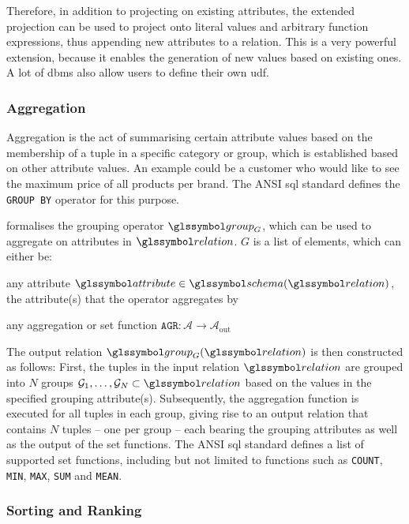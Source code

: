 Therefore, in addition to projecting on existing attributes, the extended projection can be used to project onto literal values and arbitrary function expressions, thus appending new attributes to a relation. This is a very powerful extension, because it enables the generation of new values based on existing ones. A lot of \acrshort{dbms} also allow users to define their own \acrfull{udf}.

\subsubsection{Aggregation}

Aggregation is the act of summarising certain attribute values based on the membership of a tuple in a specific category or group, which is established based on other attribute values. An example could be a customer who would like to see the maximum price of all products per brand. The ANSI \acrshort{sql} standard \cite{XOpen:1996SQL} defines the \texttt{GROUP BY} operator for this purpose.

\cite{Garcia:2009Database} formalises the grouping operator $\group_{G}$, which can be used to aggregate on attributes in $\relation$. $G$ is a list of elements, which can either be:
\begin{enumerate*}[label=(\roman*),itemjoin={{, }}, itemjoin*={{, or, }}, after={{.}}]
    \item any attribute $\attribute \in \schema(\relation)$, the attribute(s) that the operator aggregates by
    \item any aggregation or set function $\texttt{AGR} \colon \mathcal{A} \rightarrow \mathcal{A}_{\text{out}}$
\end{enumerate*}

The output relation $\group_G (\relation)$ is then constructed as follows: First, the tuples in the input relation  $\relation$ are grouped into $N$ groups $\mathcal{G}_1, \ldots,\mathcal{G}_N \subset \relation$ based on the values in the specified grouping attribute(s). Subsequently, the aggregation function is executed for all tuples in each group, giving rise to an output relation that contains $N$ tuples --  one per group -- each bearing the grouping attributes as well as the output of the set functions. The ANSI \acrshort{sql} standard \cite{XOpen:1996SQL} defines a list of supported set functions, including but not limited to functions such as \texttt{COUNT}, \texttt{MIN}, \texttt{MAX}, \texttt{SUM} and \texttt{MEAN}.

\subsubsection{Sorting and Ranking}

